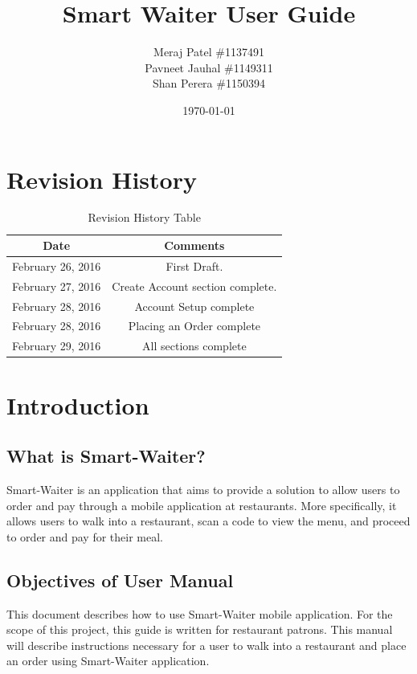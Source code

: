 \documentclass[12pt, titlepage]{article}
\begin{document}
\title{Smart Waiter User Guide} 
\author{Meraj Patel \#1137491 \\ Pavneet Jauhal \#1149311\\ Shan Perera \#1150394}
\date{\today}
\maketitle

\tableofcontents 

\listoftables

\begin{table}[H]
\section*{Revision History}
\begin{tabular}{|c|c|}
\hline
\textbf{Date}  & \textbf{Comments} \\ \hline
February 26, 2016 &  First Draft. \\ 
\hline
February 27, 2016 & Create Account section complete. \\
\hline
February 28, 2016 & Account Setup complete \\
\hline
February 28, 2016 & Placing an Order complete \\
\hline
February 29, 2016 & All sections complete \\
\hline
\end{tabular}
\caption{Revision History Table}
\end{table}



\section{Introduction}

\subsection{What is Smart-Waiter?}
Smart-Waiter is an application that aims to provide a solution to allow users to order and pay through a mobile application at restaurants. More specifically, it allows users to walk into a restaurant, scan a code to view the menu, and proceed to order and pay for their meal.
\subsection{Objectives of User Manual}
This document describes how to use Smart-Waiter mobile application. For the scope of this project, this guide is written for restaurant patrons. This manual will describe instructions necessary for a user to walk into a restaurant and place an order using Smart-Waiter application. 
\end{document}
